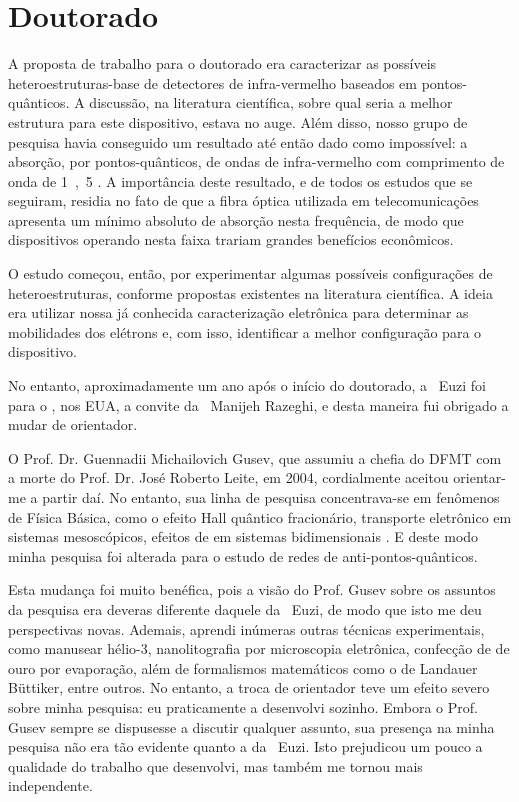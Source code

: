 \section{Doutorado}

A proposta de trabalho para o doutorado era caracterizar as possíveis heteroestruturas-base de detectores de infra-vermelho baseados em pontos-quânticos. A discussão, na literatura científica, sobre qual seria a melhor estrutura para este dispositivo, estava no auge. Além disso, nosso grupo de pesquisa havia conseguido um resultado até então dado como impossível: a absorção, por pontos-quânticos, de ondas de infra-vermelho com comprimento de onda de \unit{1,5}{\micro\metre} \cite{silva-2003}. A importância deste resultado, e de todos os estudos que se seguiram, residia no fato de que a fibra óptica utilizada em telecomunicações apresenta um mínimo absoluto de absorção nesta frequência, de modo que dispositivos operando nesta faixa trariam grandes benefícios econômicos.

O estudo começou, então, por experimentar algumas possíveis configurações de heteroestruturas, conforme propostas existentes na literatura científica. A ideia era utilizar nossa já conhecida caracterização eletrônica para determinar as mobilidades dos elétrons e, com isso, identificar a melhor configuração para o dispositivo.

No entanto, aproximadamente um ano após o início do doutorado, a \profa\ Euzi foi para o , nos EUA, a convite da \profa\ Manijeh Razeghi, e desta maneira fui obrigado a mudar de orientador.

O Prof. Dr. Guennadii Michailovich Gusev, que assumiu a chefia do DFMT com a morte do Prof. Dr. José Roberto Leite, em 2004, cordialmente aceitou orientar-me a partir daí. No entanto, sua linha de pesquisa concentrava-se em fenômenos de Física Básica, como o efeito Hall quântico fracionário, transporte eletrônico em sistemas mesoscópicos, efeitos de  em sistemas bidimensionais \etc. E deste modo minha pesquisa foi alterada para o estudo de redes de anti-pontos-quânticos.

Esta mudança foi muito benéfica, pois a visão do Prof. Gusev sobre os assuntos da pesquisa era deveras diferente daquele da \profa\ Euzi, de modo que isto me deu perspectivas novas. Ademais, aprendi inúmeras outras técnicas experimentais, como manusear hélio-3, nanolitografia por microscopia eletrônica, confecção de  de ouro por evaporação, além de formalismos matemáticos como o de Landauer Büttiker, entre outros. No entanto, a troca de orientador teve um efeito severo sobre minha pesquisa: eu praticamente a desenvolvi sozinho. Embora o Prof. Gusev sempre se dispusesse a discutir qualquer assunto, sua presença na minha pesquisa não era tão evidente quanto a da \profa\ Euzi. Isto prejudicou um pouco a qualidade do trabalho que desenvolvi, mas também me tornou mais independente.

